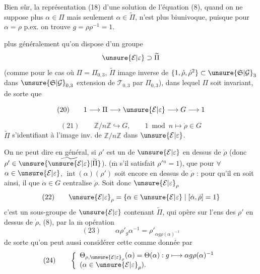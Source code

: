 Bien sûr, la représentation (18) d'une solution de l'équation (8),  quand on ne suppose plus $\alpha\in\Pi$ mais seulement $\alpha\in\widetilde\Pi$, n'est plus biunivoque, puisque pour $\alpha=\rho$ p.ex. on trouve  $g=\rho\rho^{-1}=1$.

 plus généralement qu'on dispose d'un groupe
\[
\unsure{\mathcal E|\varepsilon}\supset\widetilde\Pi
\]
(comme pour le  cas où $\Pi=\Pi_{0,3}$, $\widetilde\Pi$ image inverse de $\{1,\dot\rho,\dot\rho^2\}\subset\unsure{\mathfrak S|\mathcal G}_3$ dans $\unsure{\mathfrak S|\mathcal G}_{0,3}$ extension de $\mathcal T_{0,3}$ par $\Pi_{0,3}$), dans lequel $\Pi$ soit invariant, de sorte que 



\[
(20)\qquad 1\longrightarrow\Pi\longrightarrow\unsure{\mathcal E|\varepsilon}\longrightarrow G\longrightarrow1
\]


\[
(21)\qquad \mathbb Z/n\mathbb Z\hookrightarrow G,\qquad
1\bmod n\longmapsto\dot\rho\in G
\]
$\widetilde\Pi$ s'identifiant à l'image inv. de $\mathbb Z/n\mathbb Z$ dans $\unsure{\mathcal E|\varepsilon}$.

On ne peut dire en général, si $\rho'$ est un  de $\unsure{\mathcal E|\varepsilon}$ en dessus de $\dot\rho$ (donc $\rho'\in\unsure{\widetilde{\unsure{\mathcal E|\varepsilon}}|\widetilde\Pi}$).
($\overline{\mathrm m}$ s'il satisfait $\rho'{}^n=1$), que pour $\forall$ $\alpha\in\unsure{\mathcal E|\varepsilon}$, $\operatorname{int}(\alpha)(\rho')$ soit encore en dessus de $\dot\rho$ :
pour qu'il en soit ainsi, il  que $\dot\alpha\in G$ centralise $\dot\rho$. Soit donc $\unsure{\mathcal E|\varepsilon}_\rho$
\[
(22)\qquad
\unsure{\mathcal E|\varepsilon}_\rho=\{\alpha\in\unsure{\mathcal E|\varepsilon}\mid[\dot\alpha,\dot\rho]=1\}
\]
c'est un sous-groupe de $\unsure{\mathcal E|\varepsilon}$ contenant $\widetilde\Pi$, qui
 opère sur l'ens des  $\rho'$ en dessus de $\dot\rho$,
 (8),  par la $\overline{\mathrm m}$ opération
\[
(23)\qquad
\alpha\rho'_g\alpha^{-1}=\rho'_{\alpha g\rho(\alpha)^{-1}}
\]
de sorte qu'on peut aussi considérer cette  comme donnée par
\[
(24)\qquad
\left\{
\begin{array}{l}
\Theta_{\rho,\unsure{\mathcal E|\varepsilon}_\rho}(\alpha)=\Theta(\alpha):
g\longmapsto\alpha g\rho(\alpha)^{-1}\\
(\alpha\in\unsure{\mathcal E|\varepsilon}_\rho).
\end{array}
\right.
\]


